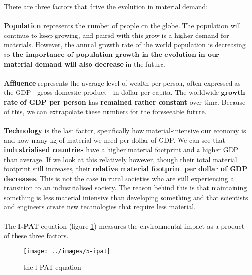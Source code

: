 \documentclass[../summary.tex]{subfiles}
\begin{document}
There are three factors that drive the evolution in material demand:
\\\\
\textbf{Population} represents the number of people on the globe. The population will continue to keep growing, and paired with this grow is a higher demand for materials. However, the annual growth rate of the world population is decreasing so \textbf{the importance of population growth in the evolution in our material demand will also decrease} in the future.
\\\\
\textbf{Affluence} represents the average level of wealth per person, often expressed as the GDP - gross domestic product - in dollar per capita. The worldwide \textbf{growth rate of GDP per person} has \textbf{remained rather constant} over time. Because of this, we can extrapolate these numbers for the foreseeable future.
\\\\
\textbf{Technology} is the last factor, specifically how material-intensive our economy is and how many \unit{\kilo\gram} of material we need per dollar of GDP. We can see that \textbf{industrialised countries} have a higher material footprint and a higher GDP than average. If we look at this relatively however, though their total material footprint still increases, their \textbf{relative material footprint per dollar of GDP decreases}. This is not the case in rural societies who are still experiencing a transition to an industrialised society. The reason behind this is that maintaining something is less material intensive than developing something and that scientists and engineers create new technologies that require less material.
\\\\
The \textbf{I-PAT} equation (figure \ref{fig:ipat}) measures the environmental impact as a product of these three factors.
\begin{figure}[H]
	\centering
	\texttt{[image: ../images/5-ipat]}
	\caption{the I-PAT equation}
	\label{fig:ipat}
\end{figure}
\end{document}
